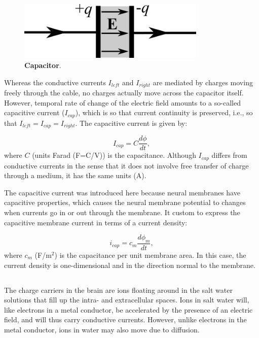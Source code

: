\begin{figure}[!ht]
\begin{center}
\includegraphics[width=0.8\textwidth]{Figures/Basics/Capacitor.png}
\end{center}
\caption{{\bf Capacitor}. 
}
\label{Basics:fig:Capacitor}
\end{figure}

Whereas the conductive currents $I_{left}$ and $I_{right}$ are mediated by charges moving freely through the cable, no charges actually move across the capacitor itself. However, temporal rate of change of the electric field amounts to a so-called capacitive current  ($I_{cap}$), which is so that current continuity is preserved, i.e., so that $I_{left} = I_{cap} = I_{right}$. The capacitive current is given by: 

\begin{equation}
I_{cap} = C\frac{d\phi}{dt}, 
\label{Basics:eq:Icap}
\end{equation}
where $C$ (units Farad (F=C/V)) is the capacitance. Although $I_{cap}$ differs from conductive currents in the sense that it does not involve free transfer of charge through a medium, it has the same units (A). 

The capacitive current was introduced here because neural membranes have capacitive properties, which causes the neural membrane potential to changes when currents go in or out through the membrane. It custom to express the capacitive membrane current in terms of a current density: 

\begin{equation}
i_{cap} = c_m\frac{d\phi_m}{dt}, 
\label{Basics:eq:Icap_mem}
\end{equation}
where $c_m$ (F/m$^2$) is the capacitance per unit membrane area. In this case, the current density is one-dimensional and in the direction normal to the membrane.


\subsection{}
 
The charge carriers in the brain are ions floating around in the salt water solutions that fill up the intra- and extracellular spaces. Ions in salt water will, like electrons in a metal conductor, be accelerated by the presence of an electric field, and will thus carry conductive currents. However, unlike electrons in the metal conductor, ions in water may also move due to diffusion. 

